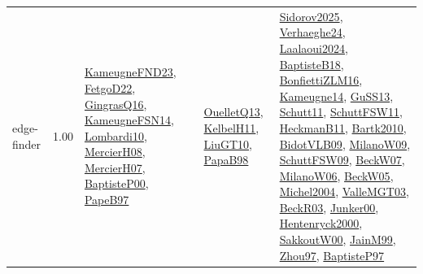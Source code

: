 {\begin{longtable}{p{3cm}r>{\raggedright\arraybackslash}p{6cm}>{\raggedright\arraybackslash}p{6cm}>{\raggedright\arraybackslash}p{8cm}}
\index{edge-finder}\index{Algorithms!edge-finder}edge-finder &  1.00 & \hyperref[detail:KameugneFND23]{KameugneFND23}, \hyperref[detail:FetgoD22]{FetgoD22}, \hyperref[detail:GingrasQ16]{GingrasQ16}, \hyperref[detail:KameugneFSN14]{KameugneFSN14}, \hyperref[detail:Lombardi10]{Lombardi10}, \hyperref[detail:MercierH08]{MercierH08}, \hyperref[detail:MercierH07]{MercierH07}, \hyperref[detail:BaptisteP00]{BaptisteP00}, \hyperref[detail:PapeB97]{PapeB97} & \hyperref[detail:OuelletQ13]{OuelletQ13}, \hyperref[detail:KelbelH11]{KelbelH11}, \hyperref[detail:LiuGT10]{LiuGT10}, \hyperref[detail:PapaB98]{PapaB98} & \hyperref[detail:Sidorov2025]{Sidorov2025}, \hyperref[detail:Verhaeghe24]{Verhaeghe24}, \hyperref[detail:Laalaoui2024]{Laalaoui2024}, \hyperref[detail:BaptisteB18]{BaptisteB18}, \hyperref[detail:BonfiettiZLM16]{BonfiettiZLM16}, \hyperref[detail:Kameugne14]{Kameugne14}, \hyperref[detail:GuSS13]{GuSS13}, \hyperref[detail:Schutt11]{Schutt11}, \hyperref[detail:SchuttFSW11]{SchuttFSW11}, \hyperref[detail:HeckmanB11]{HeckmanB11}, \hyperref[detail:Bartk2010]{Bartk2010}, \hyperref[detail:BidotVLB09]{BidotVLB09}, \hyperref[detail:MilanoW09]{MilanoW09}, \hyperref[detail:SchuttFSW09]{SchuttFSW09}, \hyperref[detail:BeckW07]{BeckW07}, \hyperref[detail:MilanoW06]{MilanoW06}, \hyperref[detail:BeckW05]{BeckW05}, \hyperref[detail:Michel2004]{Michel2004}, \hyperref[detail:ValleMGT03]{ValleMGT03}, \hyperref[detail:BeckR03]{BeckR03}, \hyperref[detail:Junker00]{Junker00}, \hyperref[detail:Hentenryck2000]{Hentenryck2000}, \hyperref[detail:SakkoutW00]{SakkoutW00}, \hyperref[detail:JainM99]{JainM99}, \hyperref[detail:Zhou97]{Zhou97}, \hyperref[detail:BaptisteP97]{BaptisteP97}\\

\end{longtable}}
